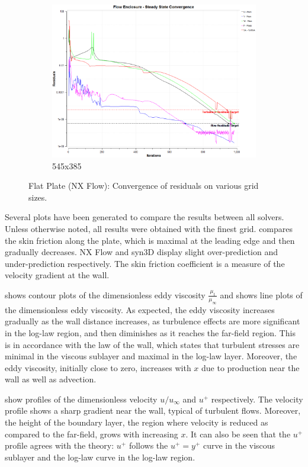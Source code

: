 \begin{figure}[ht!]
\begin{subfigure}{0.48\textwidth}
        \includegraphics[width=\textwidth]{./figs/flatnx/545x385_conv.png}
        \caption{545x385}
    \end{subfigure}
    \caption{Flat Plate (NX Flow): Convergence of residuals on various grid sizes.}
    \label{fig:nxflatcnvstudy}
\end{figure}

Several plots have been generated to compare the results between all solvers. Unless otherwise noted, all results were obtained with the finest grid.  compares the skin friction along the plate, which is maximal at the leading edge and then gradually decreases. NX Flow and syn3D display slight over-prediction and under-prediction respectively. The skin friction coefficient is a measure of the velocity gradient at the wall.

 shows contour plots of the dimensionless eddy viscosity $\frac{\mu_t}{\mu_{\infty}}$ and  shows line plots of the dimensionless eddy viscosity. As expected, the eddy viscosity increases gradually as the wall distance increases, as turbulence effects are more significant in the log-law region, and then diminishes as it reaches the far-field region. This is in accordance with the law of the wall, which states that turbulent stresses are minimal in the viscous sublayer and maximal in the log-law layer. Moreover, the eddy viscosity, initially close to zero, increases with $x$ due to production near the wall as well as advection.

 show profiles of the dimensionless velocity $u/u_\infty$ and $u^+$ respectively. The velocity profile shows a sharp gradient near the wall, typical of turbulent flows. Moreover, the height of the boundary layer, the region where velocity is reduced as compared to the far-field, grows with increasing $x$. It can also be seen that the $u^+$ profile agrees with the theory: $u^+$ follows the $u^+=y^+$ curve in the viscous sublayer and the log-law curve in the log-law region.


